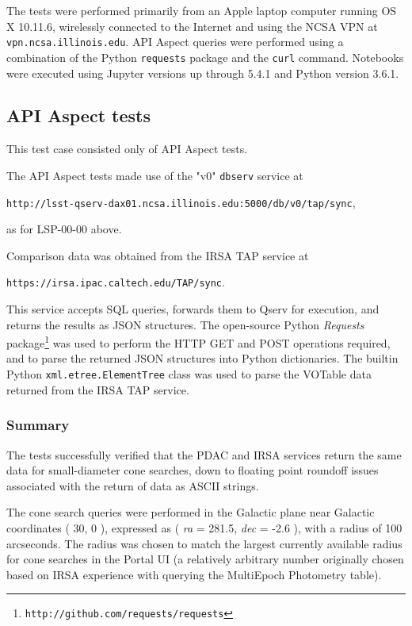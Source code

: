 
The tests were performed primarily from an Apple laptop computer running OS X 10.11.6,
wirelessly connected to the Internet and using the NCSA VPN at \texttt{vpn.ncsa.illinois.edu}.
API Aspect queries were performed using a combination of the Python \texttt{requests} package and the \texttt{curl} command.
Notebooks were executed using Jupyter versions up through 5.4.1 and Python version 3.6.1.

\subsection{API Aspect tests}

This test case consisted only of API Aspect tests.

The API Aspect tests made use of the "v0" \texttt{dbserv} service at 

\begin{center}
\texttt{http://lsst-qserv-dax01.ncsa.illinois.edu:5000/db/v0/tap/sync},
\end{center}

as for LSP-00-00 above.

Comparison data was obtained from the IRSA TAP service at

\begin{center}
\texttt{https://irsa.ipac.caltech.edu/TAP/sync}.
\end{center}

This service accepts SQL queries, forwards them to Qserv for execution, and returns the results as JSON structures.
The open-source Python \emph{Requests} package\footnote{\texttt{http://github.com/requests/requests}} was used to perform the HTTP GET and POST operations required, and to parse the returned JSON structures into Python dictionaries.
The builtin Python \texttt{xml.etree.ElementTree} class was used to parse the VOTable data returned from the IRSA TAP service.

\subsubsection{Summary}

The tests successfully verified that the PDAC and IRSA services return the same data for small-diameter cone searches, 
down to floating point roundoff issues associated with the return of data as ASCII strings.

The cone search queries were performed in the Galactic plane near Galactic coordinates ( 30, 0 ),
expressed as ( \emph{ra} = 281.5, \emph{dec} = -2.6 ), with a radius of 100 arcseconds.
The radius was chosen to match the largest currently available radius for cone searches in the Portal UI 
(a relatively arbitrary number originally chosen based on IRSA experience with querying the MultiEpoch Photometry table).

